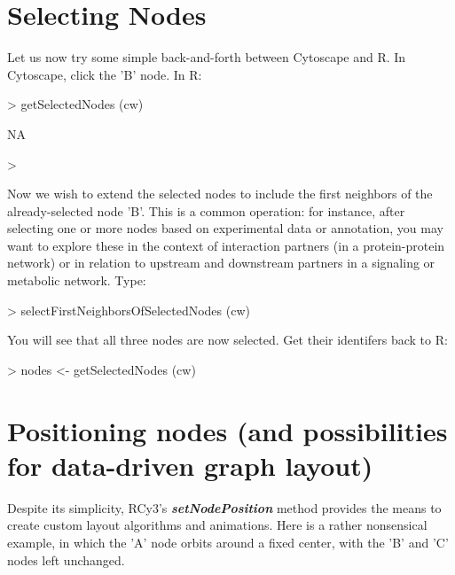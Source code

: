 \documentclass[12pt]{article}
\begin{document}
\section{Selecting Nodes}

Let us now try some simple back-and-forth between Cytoscape and R.  In Cytoscape, click the 'B' node.  In R:

\begin{Schunk}
\begin{Sinput}
>   getSelectedNodes (cw)
\end{Sinput}
\begin{Soutput}
[1] NA
\end{Soutput}
\begin{Sinput}
>     
\end{Sinput}
\end{Schunk}

Now we wish to extend the selected nodes to include the first neighbors of the already-selected node 'B'.  This is a common operation: for instance, after selecting one or more nodes based on experimental data or annotation, you may want to explore these in the context of interaction partners (in a protein-protein network) or in relation to upstream and downstream partners in a signaling or metabolic network.  Type:

\begin{Schunk}
\begin{Sinput}
>   selectFirstNeighborsOfSelectedNodes (cw)
\end{Sinput}
\end{Schunk}

You will see that all three nodes are now selected.  Get their identifers back to R:

\begin{Schunk}
\begin{Sinput}
>   nodes <- getSelectedNodes (cw)
\end{Sinput}
\end{Schunk}


\section{Positioning nodes (and possibilities for data-driven graph layout)}

Despite its simplicity, RCy3's \emph{\textbf{setNodePosition}} method provides the means to create custom layout algorithms and animations.  Here is a rather nonsensical example, in which the 'A' node orbits around a fixed center, with the 'B' and 'C' nodes left unchanged.
\end{document}
